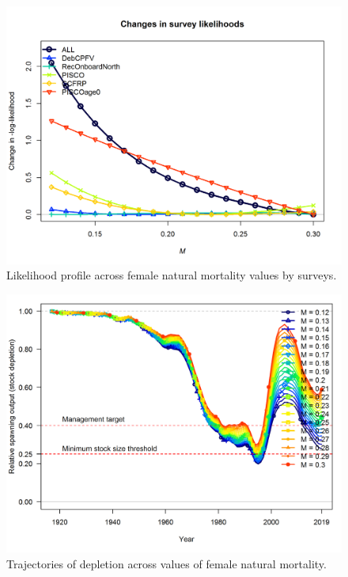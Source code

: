 \documentclass[12pt,]{article}
\begin{document}
\FloatBarrier 

\begin{figure}
\centering
\includegraphics{Figures/profile_m_piner2.png}
\caption{Likelihood profile across female natural mortality values by
surveys. \label{fig:profile_m_piner2}}
\end{figure}

\FloatBarrier

\begin{figure}
\centering
\includegraphics{Figures/profile_m_depl.png}
\caption{Trajectories of depletion across values of female natural
mortality. \label{fig:profile_m_depl}}
\end{figure}
\end{document}

